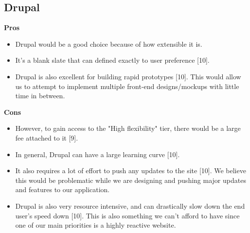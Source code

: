 \documentclass[onecolumn, draftclsnofoot,10pt, compsoc]{IEEEtran}
\begin{document}
	\subsection{Drupal}	
		\textbf{Pros} 
			\begin{itemize}
				\item Drupal would be a good choice because of how extensible it is. 
				\item It's a blank slate that can defined exactly to user preference [10]. 
				\item Drupal is also excellent for building rapid prototypes [10]. This would allow us to attempt to implement multiple front-end designs/mockups with little time in between.
			\end{itemize}
		\textbf{Cons}
			\begin{itemize}
				\item However, to gain access to the "High flexibility" tier, there would be a large fee attached to it [9]. 
				\item In general, Drupal can have a large learning curve [10]. 
				\item It also requires a lot of effort to push any updates to the site [10]. We believe this would be problematic while we are designing and pushing major updates and features to our application. 
				\item Drupal is also very resource intensive, and can drastically slow down the end user's speed down [10]. This is also something we can't afford to have since one of our main priorities is a highly reactive website.
			\end{itemize}
			
\end{document}

